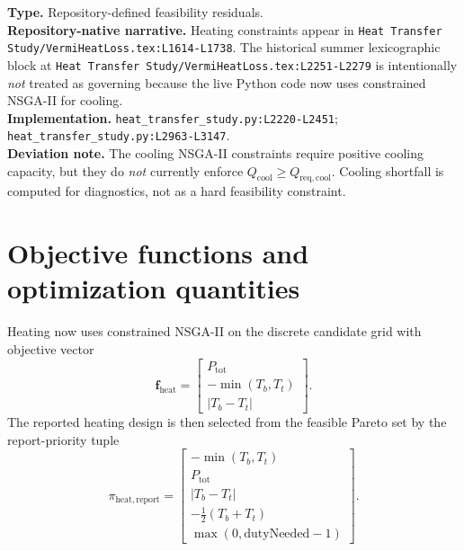 \documentclass[11pt]{article}
\newcommand{\srcref}[1]{\nolinkurl{#1}}
\newcommand{\filepath}[1]{\nolinkurl{#1}}
\begin{document}
\textbf{Type.} Repository-defined feasibility residuals. \\
\textbf{Repository-native narrative.} Heating constraints appear in \filepath{Heat Transfer Study/VermiHeatLoss.tex:L1614-L1738}. The historical summer lexicographic block at \filepath{Heat Transfer Study/VermiHeatLoss.tex:L2251-L2279} is intentionally \emph{not} treated as governing because the live Python code now uses constrained NSGA-II for cooling. \\
\textbf{Implementation.} \srcref{heat_transfer_study.py:L2220-L2451}; \srcref{heat_transfer_study.py:L2963-L3147}. \\
\textbf{Deviation note.} The cooling NSGA-II constraints require positive cooling capacity, but they do \emph{not} currently enforce \(Q_{\mathrm{cool}}\ge Q_{\mathrm{req,cool}}\). Cooling shortfall is computed for diagnostics, not as a hard feasibility constraint.

\section{Objective functions and optimization quantities}
Heating now uses constrained NSGA-II on the discrete candidate grid with objective vector
\begin{equation}
\label{eq:heating_objective_vector}
\mathbf{f}_{\mathrm{heat}}=
\begin{bmatrix}
P_{\mathrm{tot}}\\
-\min(T_b,T_t)\\
|T_b-T_t|
\end{bmatrix}.
\end{equation}
The reported heating design is then selected from the feasible Pareto set by the report-priority tuple
\begin{equation}
\label{eq:reported_design_selection}
\pi_{\mathrm{heat,report}}=
\begin{bmatrix}
-\min(T_b,T_t)\\
P_{\mathrm{tot}}\\
|T_b-T_t|\\
-\tfrac{1}{2}(T_b+T_t)\\
\max(0,\mathrm{dutyNeeded}-1)
\end{bmatrix}.
\end{equation}
\end{document}
